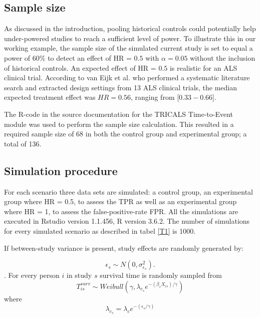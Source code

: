 \documentclass[Royal,sagev,times]{sagej}
\begin{document}
\subsection{Sample size}
As discussed in the introduction, pooling historical controls could potentially help under-powered studies to reach a sufficient level of power. To illustrate this in our working example, the sample size of the simulated current study is set to equal a power of $60\%$ to detect an effect of HR = $0.5$ with $\alpha = 0.05$ without the inclusion of historical controls. An expected effect of HR = $0.5$ is realistic for an ALS clinical trial. According to van Eijk et al. who performed a systematic literature search and extracted design settings from 13 ALS clinical trials, the median expected treatment effect was $HR = 0.56$, ranging from [$0.33 - 0.66$].\cite{van2019}

The R-code in the source documentation for the TRICALS Time-to-Event module was used to perform the sample size calculation.\cite{van2019} This resulted in a required sample size of 68 in both the control group and experimental group; a total of 136.

\subsection{Simulation procedure}
For each scenario three data sets are simulated: a control group, an experimental group where HR = 0.5, to assess the TPR as well as an experimental group where HR = 1, to assess the false-positive-rate FPR. All the simulations are executed in Rstudio version 1.1.456,\cite{Rstudio} R version 3.6.2.\cite{Rmanual} The number of simulations for every simulated scenario as described in tabel \ref{T1} is 1000. 

If between-study variance is present, study effects are randomly generated by:

 \begin{equation}
 \epsilon_s \sim N (0,\sigma^2_{\epsilon_{s}}).
 \end{equation}. 
For every person $i$ in study $s$ survival time is randomly sampled from
\begin{equation}
    T^{surv}_{is} \sim Weibull(\gamma,\lambda_{c_s} e^{-(\beta_sX_{is})/\gamma})
\end{equation}
where
\begin{equation}
    \lambda_{c_s} = \lambda_c e^{-(\epsilon_s/\gamma)}
\end{equation}
\end{document}
